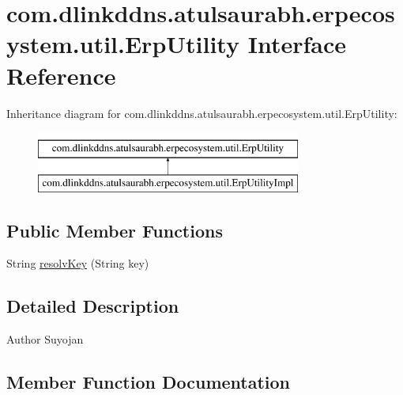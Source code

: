 \hypertarget{interfacecom_1_1dlinkddns_1_1atulsaurabh_1_1erpecosystem_1_1util_1_1_erp_utility}{}\section{com.\+dlinkddns.\+atulsaurabh.\+erpecosystem.\+util.\+Erp\+Utility Interface Reference}
\label{interfacecom_1_1dlinkddns_1_1atulsaurabh_1_1erpecosystem_1_1util_1_1_erp_utility}
Inheritance diagram for com.\+dlinkddns.\+atulsaurabh.\+erpecosystem.\+util.\+Erp\+Utility\+:\begin{figure}[H]
\begin{center}
\leavevmode
\includegraphics[height=2.000000cm]{interfacecom_1_1dlinkddns_1_1atulsaurabh_1_1erpecosystem_1_1util_1_1_erp_utility}
\end{center}
\end{figure}
\subsection*{Public Member Functions}
\begin{DoxyCompactItemize}
\item 
String \mbox{\hyperlink{interfacecom_1_1dlinkddns_1_1atulsaurabh_1_1erpecosystem_1_1util_1_1_erp_utility_a177b7a6f2a1ab3a9e620ca914ddcd6d9}{resolv\+Key}} (String key)
\end{DoxyCompactItemize}


\subsection{Detailed Description}
\begin{DoxyAuthor}{Author}
Suyojan 
\end{DoxyAuthor}


\subsection{Member Function Documentation}
\mbox{\label{interfacecom_1_1dlinkddns_1_1atulsaurabh_1_1erpecosystem_1_1util_1_1_erp_utility_a177b7a6f2a1ab3a9e620ca914ddcd6d9}} 
